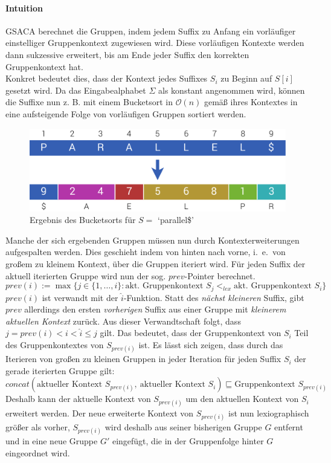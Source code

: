 \documentclass[twoside,a4paper,11pt]{article}
\theoremstyle{break}
\begin{document}
\paragraph{Intuition} GSACA berechnet die Gruppen, indem jedem Suffix zu Anfang ein vorläufiger einstelliger Gruppenkontext zugewiesen wird. Diese vorläufigen Kontexte werden dann sukzessive erweitert, bis am Ende jeder Suffix den korrekten Gruppenkontext hat.\\

Konkret bedeutet dies, dass der Kontext jedes Suffixes $S_i$ zu Beginn auf $S[i]$ gesetzt wird. Da das Eingabealphabet $\Sigma$ als konstant angenommen wird, können die Suffixe nun z. B. mit einem Bucketsort in $\mathcal{O}(n)$ gemäß ihres Kontextes in eine aufsteigende Folge von vorläufigen Gruppen sortiert werden.

\begin{figure}[h]
	\centering
	\includegraphics[width=0.5\linewidth,bb=0 0 640 207]{./assets/bucketsort.pdf}
	\caption{Ergebnis des Bucketsorts für $S =$ `parallel\$'}
\label{fig:bucketsort}
\end{figure}

Manche der sich ergebenden Gruppen müssen nun durch Kontexterweiterungen aufgespalten werden. Dies geschieht indem von hinten nach vorne, i.~e.\ von großem zu kleinem Kontext, über die Gruppen iteriert wird. Für jeden Suffix der aktuell iterierten Gruppe wird nun der sog. $prev$-Pointer berechnet.
$$prev(i) := \max \{ j \in \{ 1, \dots, i \}: \text{akt. Gruppenkontext } S_j <_{lex} \text{akt. Gruppenkontext } S_i \}$$
$prev(i)$ ist verwandt mit der $\widehat{i}$-Funktion. Statt des \textit{nächst kleineren} Suffix, gibt $prev$ allerdings den ersten \textit{vorherigen} Suffix aus einer Gruppe mit \textit{kleinerem aktuellen Kontext} zurück. Aus dieser Verwandtschaft folgt, dass $j = prev(i) < i < \widehat{i} \le \widehat{j}$ gilt. Das bedeutet, dass der Gruppenkontext von $S_i$ Teil des Gruppenkontextes von $S_{prev(i)}$ ist. Es lässt sich zeigen, dass durch das Iterieren von großen zu kleinen Gruppen in jeder Iteration für jeden Suffix $S_i$ der gerade iterierten Gruppe gilt:
$$concat(\text{aktueller Kontext } S_{prev(i)},\ \text{aktueller Kontext } S_i) \sqsubseteq \text{Gruppenkontext } S_{prev(i)}$$
Deshalb kann der aktuelle Kontext von $S_{prev(i)}$ um den aktuellen Kontext von $S_i$ erweitert werden. Der neue erweiterte Kontext von $S_{prev(i)}$ ist nun lexiographisch größer als vorher, $S_{prev(i)}$ wird deshalb aus seiner bisherigen Gruppe $G$ entfernt und in eine neue Gruppe $G'$ eingefügt, die in der Gruppenfolge hinter $G$ eingeordnet wird.
\end{document}
